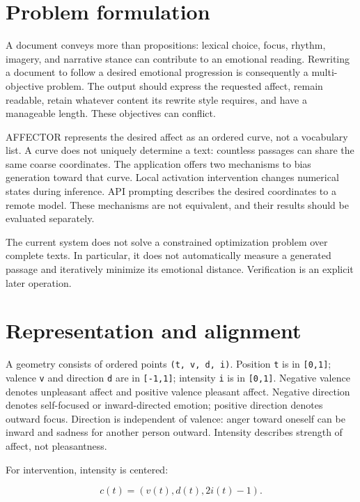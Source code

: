 \documentclass[manuscript,screen,nonacm]{acmart}
\begin{document}
\section{Problem formulation}\label{problem-formulation}

A document conveys more than propositions: lexical choice, focus,
rhythm, imagery, and narrative stance can contribute to an emotional
reading. Rewriting a document to follow a desired emotional progression
is consequently a multi-objective problem. The output should express the
requested affect, remain readable, retain whatever content its rewrite
style requires, and have a manageable length. These objectives can
conflict.

AFFECTOR represents the desired affect as an ordered curve, not a
vocabulary list. A curve does not uniquely determine a text: countless
passages can share the same coarse coordinates. The application offers
two mechanisms to bias generation toward that curve. Local activation
intervention changes numerical states during inference. API prompting
describes the desired coordinates to a remote model. These mechanisms
are not equivalent, and their results should be evaluated separately.

The current system does not solve a constrained optimization problem
over complete texts. In particular, it does not automatically measure a
generated passage and iteratively minimize its emotional distance.
Verification is an explicit later operation.

\section{Representation and
alignment}\label{representation-and-alignment}

A geometry consists of ordered points \nolinkurl{(t, v, d, i)}. Position
\nolinkurl{t} is in \texttt{{[}0,1{]}}; valence \nolinkurl{v} and direction
\nolinkurl{d} are in \texttt{{[}-1,1{]}}; intensity \nolinkurl{i} is in
\texttt{{[}0,1{]}}. Negative valence denotes unpleasant affect and
positive valence pleasant affect. Negative direction denotes
self-focused or inward-directed emotion; positive direction denotes
outward focus. Direction is independent of valence: anger toward oneself
can be inward and sadness for another person outward. Intensity
describes strength of affect, not pleasantness.

For intervention, intensity is centered:

\[c(t)=(v(t),d(t),2i(t)-1).\]
\end{document}
